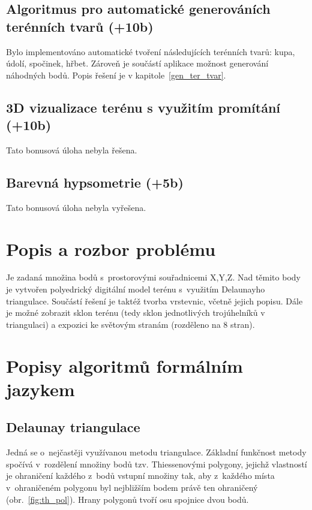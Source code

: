 \documentclass[a4paper, 12pt, oneside, titlepage]{article} %
\begin{document}
\subsection{Algoritmus pro automatické generováních terénních tvarů (+10b)}
Bylo implementováno automatické tvoření následujících terénních tvarů: kupa, údolí, spočinek, hřbet. Zároveň je součástí aplikace možnost generování náhodných bodů. Popis řešení je v kapitole~\ref{gen_ter_tvar}.

\subsection{3D vizualizace terénu s využitím promítání (+10b)}
Tato bonusová úloha nebyla řešena.

\subsection{Barevná hypsometrie (+5b)}
Tato bonusová úloha nebyla vyřešena.


\section{Popis a rozbor problému}
Je zadaná množina bodů s~prostorovými souřadnicemi X,Y,Z. Nad těmito body je vytvořen polyedrický digitální model terénu s~využitím Delaunayho triangulace. Součástí řešení je taktéž tvorba vrstevnic, včetně jejich popisu. Dále je možné zobrazit sklon terénu (tedy sklon jednotlivých trojúhelníků v triangulaci) a expozici ke světovým stranám (rozděleno na 8 stran).


\section{Popisy algoritmů formálním jazykem} \label{popisalg}

\subsection{Delaunay triangulace} \label{dt}
Jedná se o~nejčastěji využívanou metodu triangulace. Základní funkčnost metody spočívá v~rozdělení množiny bodů tzv. Thiessenovými polygony, jejichž vlastností je ohraničení každého z~bodů vstupní množiny tak, aby z~každého místa v~ohraničeném polygonu byl nejbližším bodem právě ten ohraničený (obr.~\ref{fig:th_pol}). Hrany polygonů tvoří osu spojnice dvou bodů.
\end{document}
